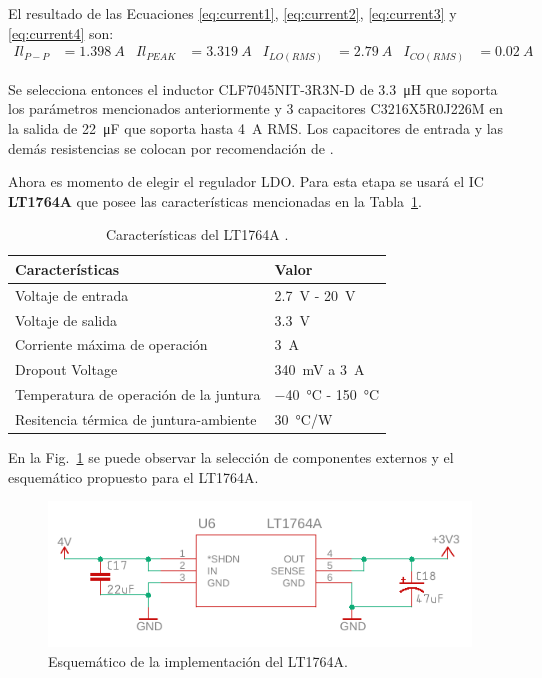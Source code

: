 El resultado de las Ecuaciones \ref{eq:current1}, \ref{eq:current2}, \ref{eq:current3} y \ref{eq:current4} son:
\begin{align*}
Il_{P-P}&=\SI{1.398}{A} &
Il_{PEAK}&=\SI{3.319}{A}&
I_{LO(RMS)}&=\SI{2.79}{A} &
I_{CO(RMS)}&=\SI{0.02}{A}
\end{align*}

Se selecciona entonces el inductor CLF7045NIT-3R3N-D de \SI{3.3}{\micro H} que soporta los parámetros mencionados anteriormente \cite{Inductor} y 3 capacitores C3216X5R0J226M en la salida de \SI{22}{\micro F}  que soporta hasta \SI{4}{A} RMS. Los capacitores de entrada y las demás resistencias se colocan por recomendación de \cite{TPS563210}.

Ahora es momento de elegir el regulador LDO. Para esta etapa se usará el IC \textbf{LT1764A} que posee las características mencionadas en la Tabla~\ref{diag:LDO}.

\bgroup
\def\arraystretch{1.5}%
\begin{table}[htbp!]
\centering
\caption[Características del LT1764A]{Características del LT1764A \cite{LT1764A}.}
\begin{tabular}{@{}ll@{}}
\toprule
Características & Valor \\ \midrule
Voltaje de entrada & \SI{2.7}{V} - \SI{20}{V} \\
Voltaje de salida & \SI{3.3}{V} \\
Corriente máxima de operación & \SI{3}{A} \\
Dropout Voltage & \SI{340}{mV} a \SI{3}{A} \\
Temperatura de operación de la juntura & \SI{-40}{\celsius} - \SI{150}{\celsius}\\
Resitencia térmica de juntura-ambiente & \SI{30}{\celsius/W}\\\bottomrule
\end{tabular}
\label{diag:LDO}
\end{table}
\egroup

En la Fig.~\ref{fig:LDO} se puede observar la selección de componentes externos y el esquemático propuesto para el LT1764A.

\begin{figure}[hbtp!]
\centering
\includegraphics[width=\textwidth]{LDO.pdf}
\caption{Esquemático de la implementación del LT1764A.}
\label{fig:LDO}
\end{figure}

